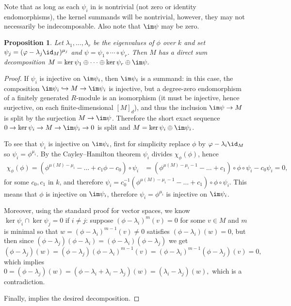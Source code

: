 \documentclass[12pt]{article}
\theoremstyle{theorem}
\numberwithin{thm}{section}
\newtheorem{prop}[thm]{Proposition}
\theoremstyle{definition}
\begin{document}
Note that as long as each $\psi_i$ in  is nontrivial (not zero or identity endomorphisms), the kernel summands will be nontrivial, however, they may not necessarily be indecomposable. Also note that $\im\psi$ may be zero.

\begin{prop}\label{prop:split-surj}
  Let $\lambda_1,\dots,\lambda_r$ be the eigenvalues of $\phi$ over $k$ and set $\psi_j = (\phi - \lambda_j\id_M)^{\mu_j}$ and $\psi = \psi_1\circ\cdots\circ\psi_r$. Then $M$ has a direct sum decomposition
  \( M = \ker\psi_1 \oplus \cdots \oplus \ker\psi_r \oplus \im\psi. \)
\end{prop}
\begin{proof}
  If $\psi_i$ is injective on $\im\psi_i$, then $\im\psi_i$ is a summand: in this case, the composition $\im\psi_i\hookrightarrow M\to \im\psi_i$ is injective, but a degree-zero endomorphism of a finitely generated $R$-module is an isomorphism (it must be injective, hence surjective, on each finite-dimensional $[M]_d$), and thus the inclusion $\im \psi \to M$ is split by the surjection $M\to \im \psi$. Therefore the short exact sequence $0\to\ker\psi_i\to M\to\im\psi_i\to 0$ is split and $M = \ker\psi_i\oplus\im\psi_i$.

  To see that $\psi_i$ is injective on $\im\psi_i$, first for simplicity replace $\phi$ by $\phi-\lambda_i\id_M$ so $\psi_i = \phi^{\mu_i}$. By the Cayley--Hamilton theorem $\psi_i$ divides $\chi_\phi(\phi)$, hence
  \begin{align*}
    \chi_\phi(\phi) = \left(\phi^{\mu(M) - \mu_i} - \dots + c_1\phi - c_0\right) \circ \psi_i
    &= \left(\phi^{\mu(M) - \mu_i - 1} - \dots + c_1\right) \circ \phi \circ \psi_i - c_0 \psi_i = 0,
  \end{align*}
  for some $c_0,c_1$ in $k$, and therefore
  \( \psi_i = c_0^{-1} \left(\phi^{\mu(M) - \mu_i - 1} - \dots + c_1\right) \circ \phi \circ \psi_i. \)
  This means that $\phi$ is injective on $\im\psi_i$, therefore $\psi_i=\phi^{\mu_i}$ is injective on $\im\psi_i$.

  Moreover, using the standard proof for vector spaces, we know $\ker\psi_i\cap\ker\psi_j = 0$ if $i\neq j$: suppose $(\phi - \lambda_i)^m(v) = 0$ for some $v\in M$ and $m$ is minimal so that $w = (\phi-\lambda_i)^{m-1}(v) \neq 0$ satisfies $(\phi-\lambda_i)(w) = 0$, but then since $(\phi - \lambda_j)(\phi - \lambda_i) = (\phi - \lambda_i)(\phi - \lambda_j)$ we get
  \[
  (\phi - \lambda_j)(w)
  = (\phi - \lambda_j)(\phi - \lambda_i)^{m-1}(v)
  = (\phi - \lambda_i)^{m-1}(\phi - \lambda_j)(v) = 0,
  \]
  which implies
  \(
  0 = (\phi - \lambda_j)(w) = (\phi - \lambda_i + \lambda_i - \lambda_j)(w) = (\lambda_i - \lambda_j)(w),
  \)
  which is a contradiction.

  Finally,  implies the desired decomposition.
\end{proof}
\end{document}
